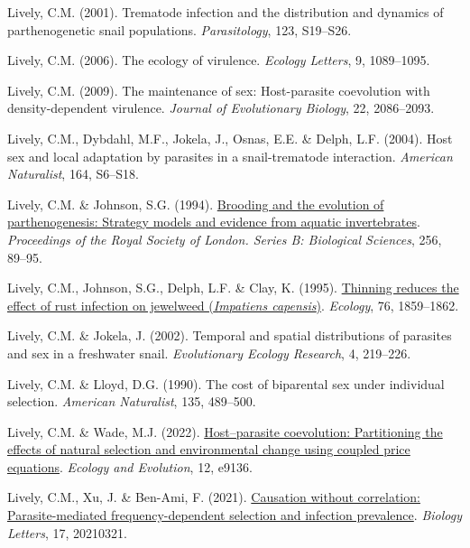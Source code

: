 \documentclass[
  letterpaper,
]{book}
\newlength{\cslhangindent}
\newenvironment{CSLReferences}[2] %
 {\begin{list}{}{%
  \setlength{\itemindent}{0pt}
  \setlength{\leftmargin}{0pt}
  \setlength{\parsep}{0pt}
  \ifodd #1
   \setlength{\leftmargin}{\cslhangindent}
   \setlength{\itemindent}{-1\cslhangindent}
  \fi
  \setlength{\itemsep}{#2\baselineskip}}}
 {\end{list}}
\begin{document}
\begin{CSLReferences}{1}{0}
Lively, C.M. (2001). Trematode infection and the distribution and
dynamics of parthenogenetic snail populations. \emph{Parasitology}, 123,
S19--S26.

Lively, C.M. (2006). The ecology of virulence. \emph{Ecology Letters},
9, 1089--1095.

Lively, C.M. (2009). The maintenance of sex: Host-parasite coevolution
with density-dependent virulence. \emph{Journal of Evolutionary
Biology}, 22, 2086--2093.

Lively, C.M., Dybdahl, M.F., Jokela, J., Osnas, E.E. \& Delph, L.F.
(2004). Host sex and local adaptation by parasites in a snail-trematode
interaction. \emph{American Naturalist}, 164, S6--S18.

Lively, C.M. \& Johnson, S.G. (1994).
\href{https://doi.org/10.1098/rspb.1994.0054}{Brooding and the evolution
of parthenogenesis: Strategy models and evidence from aquatic
invertebrates}. \emph{Proceedings of the Royal Society of London. Series
B: Biological Sciences}, 256, 89--95.

Lively, C.M., Johnson, S.G., Delph, L.F. \& Clay, K. (1995).
\href{https://doi.org/10.2307/1940718}{Thinning reduces the effect of
rust infection on jewelweed (\emph{{I}mpatiens capensis})}.
\emph{Ecology}, 76, 1859--1862.

Lively, C.M. \& Jokela, J. (2002). Temporal and spatial distributions of
parasites and sex in a freshwater snail. \emph{Evolutionary Ecology
Research}, 4, 219--226.

Lively, C.M. \& Lloyd, D.G. (1990). The cost of biparental sex under
individual selection. \emph{American Naturalist}, 135, 489--500.

Lively, C.M. \& Wade, M.J. (2022).
\href{https://doi.org/10.1002/ece3.9136}{Host--parasite coevolution:
Partitioning the effects of natural selection and environmental change
using coupled price equations}. \emph{Ecology and Evolution}, 12, e9136.

Lively, C.M., Xu, J. \& Ben-Ami, F. (2021).
\href{https://doi.org/10.1098/rsbl.2021.0321}{Causation without
correlation: Parasite-mediated frequency-dependent selection and
infection prevalence}. \emph{Biology Letters}, 17, 20210321.


\end{CSLReferences}
\end{document}

